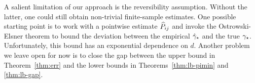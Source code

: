 A salient limitation of our approach is the reversibility assumption.
Without the latter, one could still obtain non-trivial finite-sample
estimates.
One possible starting point is to work with a pointwise estimate $\widehat
P_{ij}$ and invoke the Ostrowski-Elsner theorem
\citep{stewart1990matrix} to bound the deviation between the empirical
$\hat\gamma_{\star}$ and the true $\gamma_{\star}$.
Unfortunately, this bound has an exponential dependence on $d$.
Another problem we leave open for now is to close the gap between the
upper bound in Theorem~\ref{thm:err} and the lower bounds in
Theorems~\ref{thm:lb-pimin} and \ref{thm:lb-gap}. 
\fi

